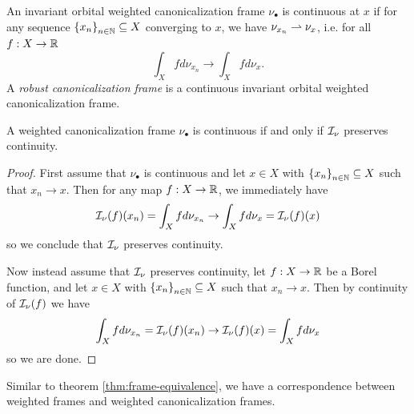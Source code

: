 \begin{definition}
    An invariant orbital weighted canonicalization frame $\nu_\bullet$ is continuous at $x$ if for any sequence $\left\{ x_n \right\}_{n \in \mathbb{N}} \subseteq X$ converging to $x$, we have $\nu_{x_n} \rightharpoonup \nu_x$, i.e. for all $f : X \to \mathbb{R}$
    \[
        \int_X f d \nu_{x_n} \to \int_X f d \nu_x.
    \]
    A \emph{robust canonicalization frame} is a continuous invariant orbital weighted canonicalization frame.
\end{definition}

\begin{theorem}\label{thm:canon-frame-cont-iff-preserves-cont}
    A weighted canonicalization frame $\nu_\bullet$ is continuous if and only if $\mathcal{I}_\nu$ preserves continuity.
    \begin{proof}
        First assume that $\nu_\bullet$ is continuous and let $x \in X$ with $\left\{ x_n \right\}_{n \in \mathbb{N}} \subseteq X$ such that $x_n \to x$.
        Then for any map $f : X \to \mathbb{R}$, we immediately have
        \[
            \mathcal{I}_\nu (f) (x_n)
            = \int_X f d \nu_{x_n}
            \to \int_X f d \nu_x
            = \mathcal{I}_\nu (f) (x)
        \]
        so we conclude that $\mathcal{I}_\nu$ preserves continuity.
        
        Now instead assume that $\mathcal{I}_\nu$ preserves continuity, let $f : X \to \mathbb{R}$ be a Borel function, and let $x \in X$ with $\left\{ x_n \right\}_{n \in \mathbb{N}} \subseteq X$ such that $x_n \to x$.
        Then by continuity of $\mathcal{I}_\nu (f)$ we have
        \[
            \int_X f d \nu_{x_n}
            = \mathcal{I}_\nu (f) (x_n)
            \to \mathcal{I}_\nu (f) (x)
            = \int_X f d \nu_x
        \]
        so we are done.
    \end{proof}
\end{theorem}


Similar to theorem \ref{thm:frame-equivalence}, we have a correspondence between weighted frames and weighted canonicalization frames.


